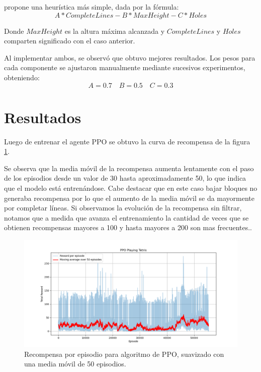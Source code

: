 \citep{ARTICLE:2} propone una heurística más simple, dada por la fórmula:
\begin{equation}
    A*CompleteLines-B*MaxHeight-C*Holes
\end{equation}

Donde \(MaxHeight\) es la altura máxima alcanzada y \(CompleteLines\) y \(Holes\) comparten significado con el caso anterior.

Al implementar ambos, se observó que \citep{ARTICLE:2} obtuvo mejores resultados. Los pesos para cada componente se ajustaron manualmente mediante sucesivos experimentos, obteniendo:
\begin{equation}
    A=0.7 \quad B=0.5 \quad C=0.3
\end{equation}

\section{Resultados}

Luego de entrenar el agente PPO se obtuvo la curva de recompensa de la figura \ref{fig:ppo_rewards}.

Se observa que la media móvil de la recompensa aumenta lentamente con el paso de los episodios desde un valor de 30 hasta aproximadamente 50, lo que indica que el modelo está entrenándose. Cabe destacar que en este caso bajar bloques no generaba recompensa por lo que el aumento de la media móvil se da mayormente por completar líneas. Si observamos la evolución de la recompensa sin filtrar, notamos que a medida que avanza el entrenamiento la cantidad de veces que se obtienen recompensas mayores a 100 y hasta mayores a 200 son mas frecuentes..

\begin{figure}[htbp]
	\centering
	\includegraphics[width=\textwidth]{./Figures/ppo_rewards.png}
	\caption{Recompensa por episodio para algoritmo de PPO, suavizado con una media móvil de 50 episodios.}
	\label{fig:ppo_rewards}
\end{figure}

